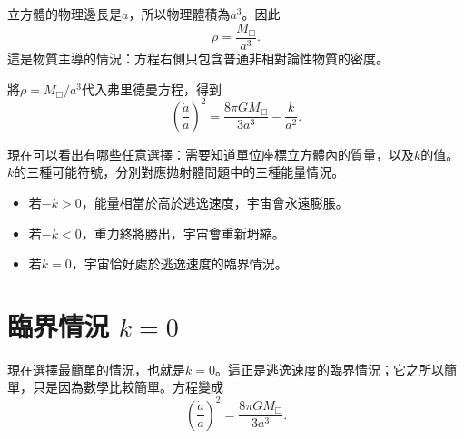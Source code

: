 
立方體的物理邊長是\(a\)，所以物理體積為\(a^3\)。因此
\begin{equation}
\rho=\frac{M_{\Box}}{a^3}.
\end{equation}
這是物質主導的情況：方程右側只包含普通非相對論性物質的密度。

\begin{classroomqa}
\end{classroomqa}

將\(\rho=M_{\Box}/a^3\)代入弗里德曼方程，得到
\begin{equation}
\left(\frac{\dot a}{a}\right)^2=\frac{8\pi G M_{\Box}}{3a^3}-\frac{k}{a^2}.
\end{equation}

現在可以看出有哪些任意選擇：需要知道單位座標立方體內的質量，以及\(k\)的值。\(k\)的三種可能符號，分別對應拋射體問題中的三種能量情況。

\begin{itemize}
\item 若\(-k>0\)，能量相當於高於逃逸速度，宇宙會永遠膨脹。
\item 若\(-k<0\)，重力終將勝出，宇宙會重新坍縮。
\item 若\(k=0\)，宇宙恰好處於逃逸速度的臨界情況。
\end{itemize}

\begin{classroomqa}
\end{classroomqa}

\section{臨界情況 \(k=0\)}

現在選擇最簡單的情況，也就是\(k=0\)。這正是逃逸速度的臨界情況；它之所以簡單，只是因為數學比較簡單。方程變成
\begin{equation}
\left(\frac{\dot a}{a}\right)^2=\frac{8\pi G M_{\Box}}{3a^3}.
\end{equation}

